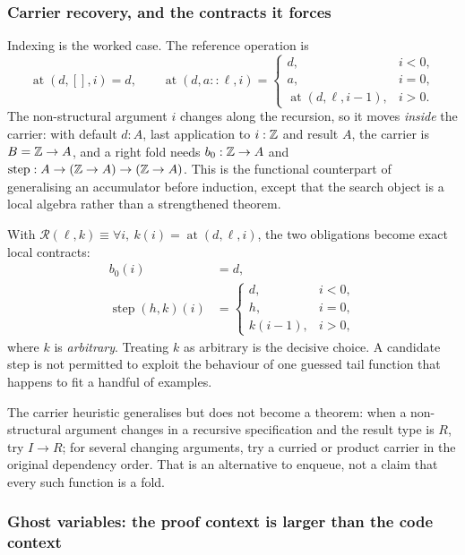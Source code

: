 \subsubsection*{Carrier recovery, and the contracts it forces}

Indexing is the worked case. The reference operation is
\[
 \operatorname{at}(d,[],i)=d,\qquad
 \operatorname{at}(d,a::\ell,i)=
 \begin{cases}
  d,&i<0,\\
  a,&i=0,\\
  \operatorname{at}(d,\ell,i-1),&i>0.
 \end{cases}
\]
The non-structural argument $i$ changes along the recursion, so it moves
\emph{inside} the carrier: with default $d:A$, last application to $i:\mathbb{Z}$ and
result $A$, the carrier is $B=\mathbb{Z}\to A$, and a right fold needs
$b_0:\mathbb{Z}\to A$ and $\operatorname{step}:A\to(\mathbb{Z}\to A)\to(\mathbb{Z}\to A)$. This is the
functional counterpart of generalising an accumulator before induction, except
that the search object is a local algebra rather than a strengthened theorem.

With $\mathcal R(\ell,k)\equiv\forall i,\ k(i)=\operatorname{at}(d,\ell,i)$, the
two obligations become exact local contracts:
\begin{align}
 b_0(i)&=d,\label{eq:base-contract}\\
 \operatorname{step}(h,k)(i)&=
 \begin{cases}
  d,&i<0,\\
  h,&i=0,\\
  k(i-1),&i>0,
 \end{cases}\label{eq:step-contract}
\end{align}
where $k$ is \emph{arbitrary}. Treating $k$ as arbitrary is the decisive
choice. A candidate step is not permitted to exploit the behaviour of one
guessed tail function that happens to fit a handful of examples.

The carrier heuristic generalises but does not become a theorem: when a
non-structural argument changes in a recursive specification and the result type
is $R$, try $I\to R$; for several changing arguments, try a curried or product
carrier in the original dependency order. That is an alternative to enqueue, not
a claim that every such function is a fold.

\subsubsection*{Ghost variables: the proof context is larger than the code context}

